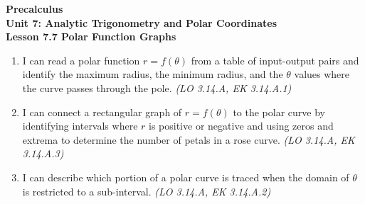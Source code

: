 \documentclass[10pt]{article}
\begin{document}
\vspace{-0.8in}

\begin{center}
  {\color{white}\textbf{\LARGE Precalculus}}\\[4pt]
  {\color{skymid}\large\textbf{Unit 7: Analytic Trigonometry and Polar Coordinates}}\\[6pt]
  {\color{white}\textbf{\large Lesson 7.7 \quad Polar Function Graphs}}
\end{center}

\vspace{0.22in}
\namedateperiod
\vspace{0.18in}

\begin{learningtargetbox}
\small
\begin{enumerate}[leftmargin=1.5em, itemsep=5pt]
  \item I can read a polar function $r = f(\theta)$ from a table of input-output pairs
    and identify the maximum radius, the minimum radius, and the $\theta$ values where
    the curve passes through the pole.
    \hfill\textit{(LO 3.14.A, EK 3.14.A.1)}
  \item I can connect a rectangular graph of $r = f(\theta)$ to the polar curve by
    identifying intervals where $r$ is positive or negative and using zeros and
    extrema to determine the number of petals in a rose curve.
    \hfill\textit{(LO 3.14.A, EK 3.14.A.3)}
  \item I can describe which portion of a polar curve is traced when the domain of
    $\theta$ is restricted to a sub-interval.
    \hfill\textit{(LO 3.14.A, EK 3.14.A.2)}
\end{enumerate}
\end{learningtargetbox}

\vspace{0.14in}
\end{document}
